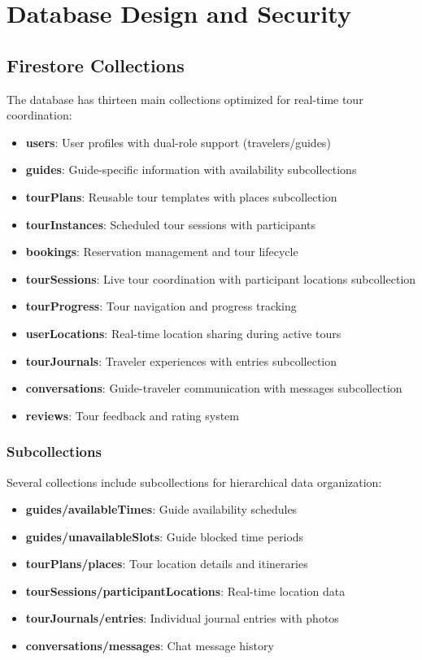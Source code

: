 \documentclass[12pt,a4paper]{article}
\begin{document}
\section{Database Design and Security}

\subsection{Firestore Collections}

The database has thirteen main collections optimized for real-time tour coordination:
\begin{itemize}
    \item \textbf{users}: User profiles with dual-role support (travelers/guides)
    \item \textbf{guides}: Guide-specific information with availability subcollections
    \item \textbf{tourPlans}: Reusable tour templates with places subcollection
    \item \textbf{tourInstances}: Scheduled tour sessions with participants
    \item \textbf{bookings}: Reservation management and tour lifecycle
    \item \textbf{tourSessions}: Live tour coordination with participant locations subcollection
    \item \textbf{tourProgress}: Tour navigation and progress tracking
    \item \textbf{userLocations}: Real-time location sharing during active tours
    \item \textbf{tourJournals}: Traveler experiences with entries subcollection
    \item \textbf{conversations}: Guide-traveler communication with messages subcollection
    \item \textbf{reviews}: Tour feedback and rating system
\end{itemize}

\subsubsection{Subcollections}

Several collections include subcollections for hierarchical data organization:
\begin{itemize}
    \item \textbf{guides/availableTimes}: Guide availability schedules
    \item \textbf{guides/unavailableSlots}: Guide blocked time periods
    \item \textbf{tourPlans/places}: Tour location details and itineraries
    \item \textbf{tourSessions/participantLocations}: Real-time location data
    \item \textbf{tourJournals/entries}: Individual journal entries with photos
    \item \textbf{conversations/messages}: Chat message history
\end{itemize}
\end{document}
